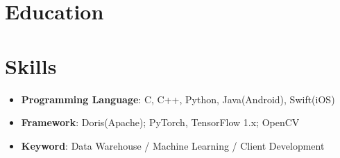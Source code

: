 \documentclass{resume}
\begin{document}


 

\section{Education}
\section{Skills}
\begin{itemize}
  \item \textbf{Programming Language}: C, C++, Python, Java(Android), Swift(iOS)
  \item \textbf{Framework}: Doris(Apache); PyTorch, TensorFlow 1.x; OpenCV
  \item \textbf{Keyword}: Data Warehouse / Machine Learning / Client Development
\end{itemize}

\end{document}
